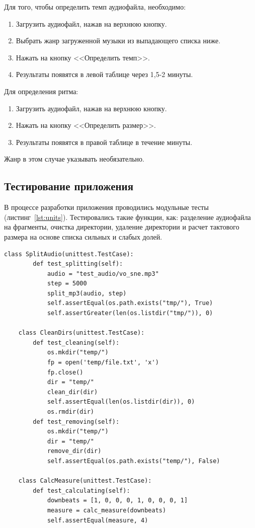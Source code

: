 Для того, чтобы определить темп аудиофайла, необходимо:

\begin{enumerate}
	\item Загрузить аудиофайл, нажав на верхнюю кнопку.
	\item Выбрать жанр загруженной музыки из выпадающего списка ниже.
	\item Нажать на кнопку <<Определить темп>>.
	\item Результаты появятся в левой таблице через 1,5-2 минуты.
\end{enumerate}

Для определения ритма:

\begin{enumerate}
	\item Загрузить аудиофайл, нажав на верхнюю кнопку.
	\item Нажать на кнопку <<Определить размер>>.
	\item Результаты появятся в правой таблице в течение минуты.
\end{enumerate}

Жанр в этом случае указывать необязательно.

\newpage

\subsection{Тестирование приложения}

В процессе разработки приложения проводились модульные тесты (листинг~\ref{lst:units}). Тестировались такие функции, как: разделение аудиофайла на фрагменты, очистка директории, удаление директории и расчет тактового размера на основе списка сильных и слабых долей.

\begin{lstlisting}[label={lst:units}, caption={модульные тесты}]
	class SplitAudio(unittest.TestCase):
		def test_splitting(self):
			audio = "test_audio/vo_sne.mp3"
			step = 5000
			split_mp3(audio, step)
			self.assertEqual(os.path.exists("tmp/"), True)
			self.assertGreater(len(os.listdir("tmp/")), 0)
	
	class CleanDirs(unittest.TestCase):
		def test_cleaning(self):
			os.mkdir("temp/")
			fp = open('temp/file.txt', 'x')
			fp.close()
			dir = "temp/"
			clean_dir(dir)
			self.assertEqual(len(os.listdir(dir)), 0)
			os.rmdir(dir)
		def test_removing(self):
			os.mkdir("temp/")
			dir = "temp/"
			remove_dir(dir)
			self.assertEqual(os.path.exists("temp/"), False)
	
	class CalcMeasure(unittest.TestCase):
		def test_calculating(self):
			downbeats = [1, 0, 0, 0, 1, 0, 0, 0, 1]
			measure = calc_measure(downbeats)
			self.assertEqual(measure, 4)
\end{lstlisting}

